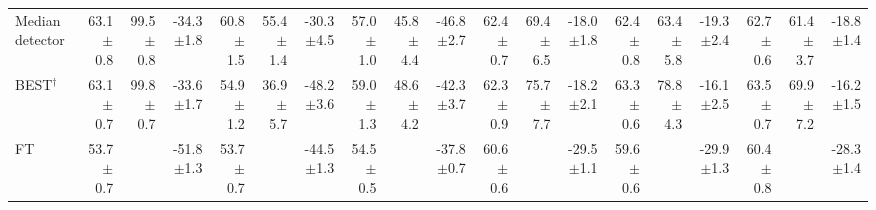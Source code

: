 \begin{tabular}{lrrrrrrrrrrrrrrrrrr}
\midrule
Median detector & 63.1\tiny{$\pm$0.8} & 99.5\tiny{$\pm$0.8} & -34.3\tiny{$\pm$1.8} & 60.8\tiny{$\pm$1.5} & 55.4\tiny{$\pm$1.4} & -30.3\tiny{$\pm$4.5} & 57.0\tiny{$\pm$1.0} & 45.8\tiny{$\pm$4.4} & -46.8\tiny{$\pm$2.7} & 62.4\tiny{$\pm$0.7} & 69.4\tiny{$\pm$6.5} & -18.0\tiny{$\pm$1.8} & 62.4\tiny{$\pm$0.8} & 63.4\tiny{$\pm$5.8} & -19.3\tiny{$\pm$2.4} & 62.7\tiny{$\pm$0.6} & 61.4\tiny{$\pm$3.7} & -18.8\tiny{$\pm$1.4} \\
BEST$^\dagger$ & 63.1\tiny{$\pm$0.7} & 99.8\tiny{$\pm$0.7} & -33.6\tiny{$\pm$1.7} & 54.9\tiny{$\pm$1.2} & 36.9\tiny{$\pm$5.7} & -48.2\tiny{$\pm$3.6} & 59.0\tiny{$\pm$1.3} & 48.6\tiny{$\pm$4.2} & -42.3\tiny{$\pm$3.7} & 62.3\tiny{$\pm$0.9} & 75.7\tiny{$\pm$7.7} & -18.2\tiny{$\pm$2.1} & 63.3\tiny{$\pm$0.6} & 78.8\tiny{$\pm$4.3} & -16.1\tiny{$\pm$2.5} & 63.5\tiny{$\pm$0.7} & 69.9\tiny{$\pm$7.2} & -16.2\tiny{$\pm$1.5} \\
\midrule
FT & 53.7\tiny{$\pm$0.7} &  & -51.8\tiny{$\pm$1.3} & 53.7\tiny{$\pm$0.7} &  & -44.5\tiny{$\pm$1.3} & 54.5\tiny{$\pm$0.5} &  & -37.8\tiny{$\pm$0.7} & 60.6\tiny{$\pm$0.6} &  & -29.5\tiny{$\pm$1.1} & 59.6\tiny{$\pm$0.6} &  & -29.9\tiny{$\pm$1.3} & 60.4\tiny{$\pm$0.8} &  & -28.3\tiny{$\pm$1.4} \\
\bottomrule
\end{tabular}
